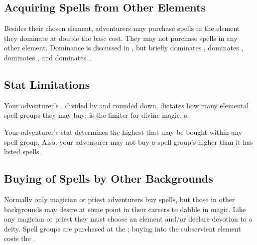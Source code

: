 \begin{multicols*}{2}
\subsection{Acquiring Spells from Other Elements}
Besides their chosen element, adventurers may purchase spells in the element they dominate at double the base cost. They may not purchase spells in any other element.
Dominance is discussed in , but briefly  dominates ,  dominates ,  dominates , and  dominates . 
\subsection{Stat Limitations}
Your adventurer's \INT, divided by  and rounded down, dictates how many elemental spell groups they may buy; \CSE is the limiter for divine magic. s.

Your adventurer's \PWR stat determines the highest  that may be bought within any spell group,  Also, your adventurer may not buy a spell group's  higher than it has listed spells.
\subsection{Buying of Spells by Other Backgrounds}
Normally only magician or priest adventurers buy spells, but those in other backgrounds may desire at some point in their careers to dabble in magic. Like any magician or priest they must choose an element and/or declare devotion to a deity. Spell groups are purchased at  the ; buying into the subservient element costs  the .


\end{multicols*}
